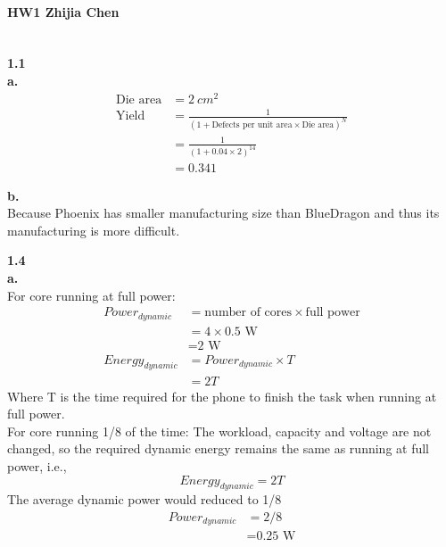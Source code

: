 \documentclass{article}
\begin{document}
\paragraph{HW1 Zhijia Chen}\text{ }\\

\noindent\textbf{1.1}\\
\indent \textbf{a.}\\
\begin{align*}
    \text{Die area} &= 2\ cm^2\\
    \text{Yield} &= \frac{1}{{(1+\text{Defects per unit area}\times \text{Die area})}^N}\\
    &= \frac{1}{{(1+0.04\times 2)}^{14}}\\
    &=0.341
\end{align*}

\indent \textbf{b.}\\
\indent Because Phoenix has smaller manufacturing size than BlueDragon and thus its manufacturing is more difficult.

\noindent\textbf{1.4}\\
\indent \textbf{a.}\\
\indent For core running at full power:\\
\begin{align*}
    Power_{dynamic}&=\text{number of cores}\times \text{full power}\\
    &=4\times \text{0.5 W}\\
    &=\text{2 W}\\
    Energy_{dynamic}&=Power_{dynamic}\times T\\
    &=2T
\end{align*}
Where T is the time required for the phone to finish the task when running at full power.\\
\indent For core running 1/8 of the time:
\indent The workload, capacity and voltage are not changed, so the required dynamic energy remains the same as running at full power, i.e., 
\begin{equation*}
    Energy_{dynamic}=2T
\end{equation*}
\indent The average dynamic power would reduced to 1/8
\begin{align*}
    Power_{dynamic}&=2/8\\
    &=\text{0.25 W}
\end{align*}
\end{document}
